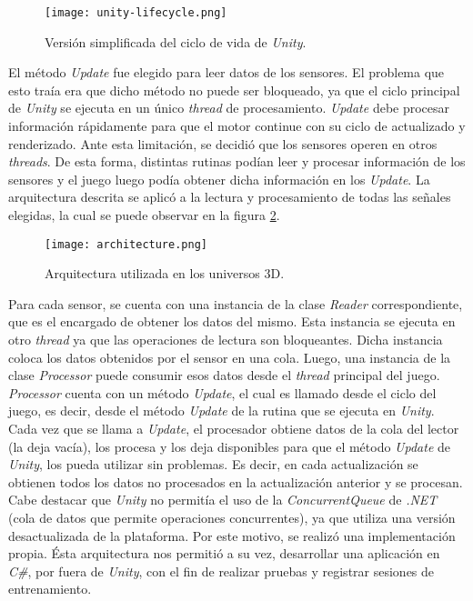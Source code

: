 \begin{figure}[H]
	\centering
    \texttt{[image: unity-lifecycle.png]}
    \caption{Versión simplificada del ciclo de vida de \emph{Unity}.}
	\label{fig:unity-lifecycle}
\end{figure}

El método \emph{Update} fue elegido para leer datos de los sensores. El problema que esto traía era que dicho método no puede ser bloqueado, ya que el ciclo principal de \emph{Unity} se ejecuta en un único \emph{thread} de procesamiento. \emph{Update} debe procesar información rápidamente para que el motor continue con su ciclo de actualizado y renderizado. Ante esta limitación, se decidió que los sensores operen en otros \emph{threads}. De esta forma, distintas rutinas podían leer y procesar información de los sensores y el juego luego podía obtener dicha información en los \emph{Update}. La arquitectura descrita se aplicó a la lectura y procesamiento de todas las señales elegidas, la cual se puede observar en la figura \ref{fig:architecture}.

\begin{figure}[H]
	\centering
    \texttt{[image: architecture.png]}
    \caption{Arquitectura utilizada en los universos 3D.}
	\label{fig:architecture}
\end{figure}

Para cada sensor, se cuenta con una instancia de la clase \emph{Reader} correspondiente, que es el encargado de obtener los datos del mismo. Esta instancia se ejecuta en otro \emph{thread} ya que las operaciones de lectura son bloqueantes. Dicha instancia coloca los datos obtenidos por el sensor en una cola. Luego, una instancia de la clase \emph{Processor} puede consumir esos datos desde el \emph{thread} principal del juego. \emph{Processor} cuenta con un método \emph{Update}, el cual es llamado desde el ciclo del juego, es decir, desde el método \emph{Update} de la rutina que se ejecuta en \emph{Unity}. Cada vez que se llama a \emph{Update}, el procesador obtiene datos de la cola del lector (la deja vacía), los procesa y los deja disponibles para que el método \emph{Update} de \emph{Unity}, los pueda utilizar sin problemas. Es decir, en cada actualización se obtienen todos los datos no procesados en la actualización anterior y se procesan. Cabe destacar que \emph{Unity} no permitía el uso de la \emph{ConcurrentQueue} de \emph{.NET} (cola de datos que permite operaciones concurrentes), ya que utiliza una versión desactualizada de la plataforma. Por este motivo, se realizó una implementación propia. Ésta arquitectura nos permitió a su vez, desarrollar una aplicación en \emph{C\#}, por fuera de \emph{Unity}, con el fin de realizar pruebas y registrar sesiones de entrenamiento.

